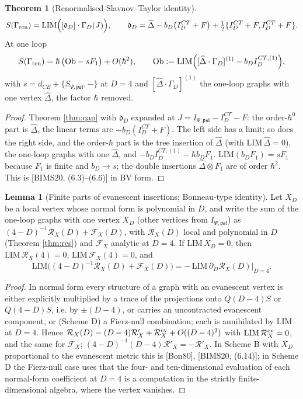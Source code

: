 \documentclass[11pt]{article}
\theoremstyle{definition}
\newtheorem{theorem}[definition]{Theorem}
\newtheorem{lemma}[definition]{Lemma}
\numberwithin{equation}{section}
\begin{document}
\begin{theorem}[Renormalised Slavnov--Taylor identity]
\label{thm:rst}
\[
S(\Gamma_{\rm ren})=\mathrm{LIM}\Big([\mathfrak d_D]\cdot\Gamma_D(J)\Big),\qquad \mathfrak d_D=\widehat\Delta-b_D\big(I^{CT}_D+F\big)+\tfrac12\{I^{CT}_D+F,I^{CT}_D+F\}.
\]
At one loop
\begin{equation}
S(\Gamma_{\rm ren})=\hbar\,\big(\mathrm{Ob}-sF_1\big)+O(\hbar^2),\qquad \mathrm{Ob}:=\mathrm{LIM}\Big([\widehat\Delta\cdot\Gamma_D]^{(1)}-b_DI^{CT,(1)}_D\Big),
\label{eq:Ob}
\end{equation}
with $s=d_{CE}+\{S_{\Psi,\mathfrak{psl}},-\}$ at $D=4$ and $[\widehat\Delta\cdot\Gamma_D]^{(1)}$ the one-loop graphs with one vertex $\widehat\Delta$, the factor $\hbar$ removed.
\end{theorem}

\begin{proof}
Theorem \ref{thm:qap} with $\mathfrak d_D$ expanded at $J=I_{\Psi,\mathfrak{psl}}-I^{CT}_D-F$: the order-$\hbar^0$ part is $\widehat\Delta$, the linear terms are $-b_D(I^{CT}_D+F)$. The left side has a limit; so does the right side, and the order-$\hbar$ part is the tree insertion of $\widehat\Delta$ (with $\mathrm{LIM}\,\widehat\Delta=0$), the one-loop graphs with one $\widehat\Delta$, and $-b_DI^{CT,(1)}_D-\hbar b_DF_1$. $\mathrm{LIM}(b_DF_1)=sF_1$ because $F_1$ is finite and $b_D\to s$; the double insertions $\widehat\Delta\otimes F_1$ are of order $\hbar^2$. This is [BIMS20, (6.3)--(6.6)] in BV form.
\end{proof}

\begin{lemma}[Finite parts of evanescent insertions; Bonneau-type identity]
\label{lem:bonneau}
Let $X_D$ be a local vertex whose normal form is polynomial in $D$, and write the sum of the one-loop graphs with one vertex $X_D$ (other vertices from $I_{\Psi,\mathfrak{psl}}$) as $(4-D)^{-1}\mathcal R_X(D)+\mathcal F_X(D)$, with $\mathcal R_X(D)$ local and polynomial in $D$ (Theorem \ref{thm:res}) and $\mathcal F_X$ analytic at $D=4$. If $\mathrm{LIM}\,X_D=0$, then $\mathrm{LIM}\,\mathcal R_X(4)=0$, $\mathrm{LIM}\,\mathcal F_X(4)=0$, and
\[
\mathrm{LIM}\Big((4-D)^{-1}\mathcal R_X(D)+\mathcal F_X(D)\Big)=-\,\mathrm{LIM}\,\partial_D\mathcal R_X(D)\big|_{D=4}.
\]
\end{lemma}

\begin{proof}
In normal form every structure of a graph with an evanescent vertex is either explicitly multiplied by a trace of the projections onto $Q(D{-}4)S$ or $Q(4{-}D)S$, i.e. by $\pm(D-4)$, or carries an uncontracted evanescent component, or (Scheme D) a Fierz-null combination; each is annihilated by $\mathrm{LIM}$ at $D=4$. Hence $\mathcal R_X(D)=(D-4)\mathcal R'_X+\mathcal R^{\rm ev}_X+O((D-4)^2)$ with $\mathrm{LIM}\,\mathcal R^{\rm ev}_X=0$, and the same for $\mathcal F_X$; $(4-D)^{-1}(D-4)\mathcal R'_X=-\mathcal R'_X$. In Scheme B with $X_D$ proportional to the evanescent metric this is [Bon80], [BIMS20, (6.14)]; in Scheme D the Fierz-null case uses that the four- and ten-dimensional evaluation of each normal-form coefficient at $D=4$ is a computation in the strictly finite-dimensional algebra, where the vertex vanishes.
\end{proof}
\end{document}
